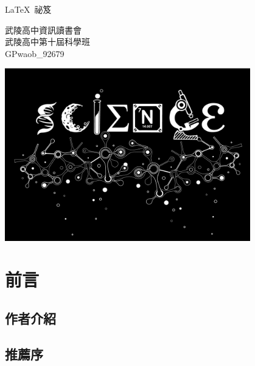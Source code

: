 \documentclass[12pt, a4paper, oneside]{extbook}
\let\tmpLaTeX\LaTeX
\renewcommand{\LaTeX}{\textrm{\tmpLaTeX}}
\begin{document}
	\makebarother %

	\begin{titlepage}
		\begin{center}
			\sffamily
			
			\begin{tcolorbox}[
				halign=flush center,
				drop fuzzy shadow,
				arc=2pt,
				height=4cm,
				valign=center]
				\fontsize{36pt}{\baselineskip}\selectfont \LaTeX\ 祕笈
			\end{tcolorbox}
			
			\vspace*{1cm}
			{\fontsize{24pt}{2\baselineskip}\selectfont%
				武陵高中資訊讀書會 \\
				武陵高中第十屆科學班 \\[\baselineskip]
				GPwaob\_92679}
			 
			
			\vfill
			
			\includegraphics[width=0.8\textwidth]{readme/science.png}
		
		
		\end{center}
	\end{titlepage}

	\tableofcontents

	\part{前言}
	\chapter*{作者介紹}
	\chapter*{推薦序}
	
\end{document}
